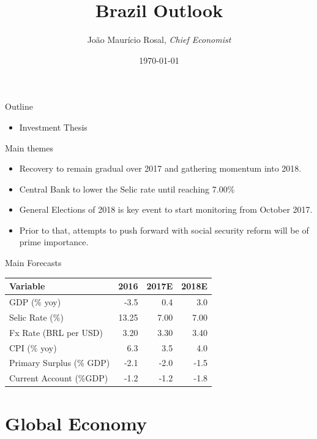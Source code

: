\documentclass[12pt, presentation, t]{beamer}
\author{João Maurício Rosal, \it{Chief Economist}}
\date{\today}
\title{Brazil Outlook}
\begin{document}
\maketitle
\begin{frame}{Outline}
\tableofcontents
\end{frame}

\begin{itemize}
\item Investment Thesis
\end{itemize}

\begin{frame}[label={sec:org69017a9}]{Main themes}
\begin{itemize}
\item Recovery to remain gradual over 2017 and gathering momentum into 2018.
\item Central Bank to lower the Selic rate until reaching 7.00\%
\item General Elections of 2018 is key event to start monitoring from October 2017.
\item Prior to that, attempts to push forward with social security reform
will be of prime importance.
\end{itemize}
\end{frame}

\begin{frame}[label={sec:orgeae0746}]{Main Forecasts}
\begin{center}
\begin{tabular}{lrrr}
\alert{Variable} & \alert{2016} & \alert{2017E} & \alert{2018E}\\
\hline
\hline
GDP (\% yoy) & -3.5 & 0.4 & 3.0\\
Selic Rate (\%) & 13.25 & 7.00 & 7.00\\
Fx Rate (BRL per USD) & 3.20 & 3.30 & 3.40\\
CPI (\% yoy) & 6.3 & 3.5 & 4.0\\
Primary Surplus (\% GDP) & -2.1 & -2.0 & -1.5\\
Current Account (\%GDP) & -1.2 & -1.2 & -1.8\\
\hline
\end{tabular}
\end{center}
\end{frame}

\section{Global Economy}
\label{sec:orgfc3fdba}
\end{document}
